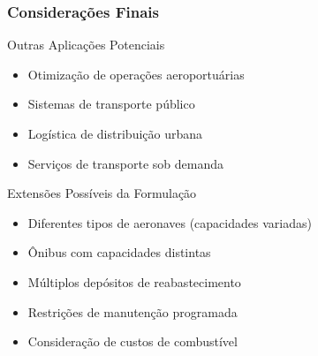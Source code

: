 \documentclass[10pt]{beamer}
\begin{document}
\begin{frame}
\frametitle{Considerações Finais}
\begin{block}{Outras Aplicações Potenciais}
\begin{itemize}
    \item Otimização de operações aeroportuárias
    \item Sistemas de transporte público
    \item Logística de distribuição urbana
    \item Serviços de transporte sob demanda
\end{itemize}
\end{block}

\begin{block}{Extensões Possíveis da Formulação}
\begin{itemize}
    \item Diferentes tipos de aeronaves (capacidades variadas)
    \item Ônibus com capacidades distintas
    \item Múltiplos depósitos de reabastecimento
    \item Restrições de manutenção programada
    \item Consideração de custos de combustível
\end{itemize}
\end{block}
\end{frame}
\end{document}
